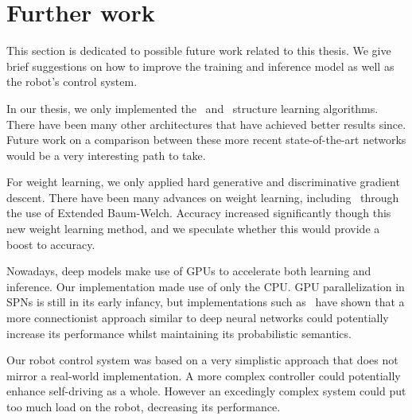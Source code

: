 \section{Further work}

This section is dedicated to possible future work related to this thesis. We give brief suggestions
on how to improve the training and inference model as well as the robot's control system.

In our thesis, we only implemented the~\cite{gens-domingos} and~\cite{clustering} structure
learning algorithms. There have been many other architectures that have achieved better results
since. Future work on a comparison between these more recent state-of-the-art networks would be a
very interesting path to take.

For weight learning, we only applied hard generative and discriminative gradient descent. There
have been many advances on weight learning, including~\cite{baum-welch} through the use of Extended
Baum-Welch. Accuracy increased significantly though this new weight learning method, and we
speculate whether this would provide a boost to accuracy.

Nowadays, deep models make use of GPUs to accelerate both learning and inference. Our
implementation made use of only the CPU. GPU parallelization in SPNs is still in its early infancy,
but implementations such as~\cite{deep-learn-spn} have shown that a more connectionist approach
similar to deep neural networks could potentially increase its performance whilst maintaining its
probabilistic semantics.

Our robot control system was based on a very simplistic approach that does not mirror a real-world
implementation. A more complex controller could potentially enhance self-driving as a whole.
However an excedingly complex system could put too much load on the robot, decreasing its
performance.
